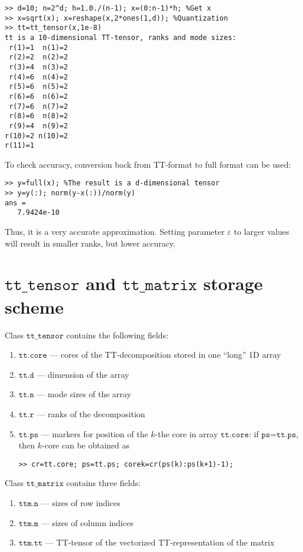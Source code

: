 \documentclass[a4paper,12pt,twoside]{article}
\def\tt{\texttt{tt\_tensor}}
\def\ttm{\texttt{tt\_matrix}}
\begin{document}
\begin{lstlisting}
>> d=10; n=2^d; h=1.0./(n-1); x=(0:n-1)*h; %Get x
>> x=sqrt(x); x=reshape(x,2*ones(1,d)); %Quantization
>> tt=tt_tensor(x,1e-8)
tt is a 10-dimensional TT-tensor, ranks and mode sizes: 
 r(1)=1  n(1)=2
 r(2)=2  n(2)=2
 r(3)=4  n(3)=2
 r(4)=6  n(4)=2
 r(5)=6  n(5)=2
 r(6)=6  n(6)=2
 r(7)=6  n(7)=2
 r(8)=6  n(8)=2
 r(9)=4  n(9)=2
r(10)=2 n(10)=2
r(11)=1        
\end{lstlisting}
To check accuracy, conversion back from TT-format to full format can be used:
\begin{lstlisting}
>> y=full(x); %The result is a d-dimensional tensor 
>> y=y(:); norm(y-x(:))/norm(y)
ans =
   7.9424e-10
\end{lstlisting}
Thus, it is a very accurate approximation. Setting parameter $\varepsilon$ to larger values will
result in smaller ranks, but lower accuracy.

\section{$\tt$ and $\ttm$ storage scheme}
Class $\tt$ contains the following fields:
\begin{enumerate}
\item $\texttt{tt.core}$ --- cores of the TT-decomposition stored in one ``long'' 1D array
\item $\texttt{tt.d}$ --- dimension of the array
\item $\texttt{tt.n}$ --- mode sizes of the array
\item $\texttt{tt.r}$ --- ranks of the decomposition
\item $\texttt{tt.ps}$ --- markers for position of the $k$-the core in array $\texttt{tt.core}$: 
if $\texttt{ps=tt.ps}$, then $k$-core can be obtained as
\begin{lstlisting}
>> cr=tt.core; ps=tt.ps; corek=cr(ps(k):ps(k+1)-1);
\end{lstlisting}
\end{enumerate}
Class $\ttm$ contains three fields:
\begin{enumerate}
\item $\texttt{ttm.n}$ --- sizes of row indices
\item $\texttt{ttm.m}$ --- sizes of column indices
\item $\texttt{ttm.tt}$ --- TT-tensor of the vectorized TT-representation of the matrix 
\end{enumerate}
\end{document}
